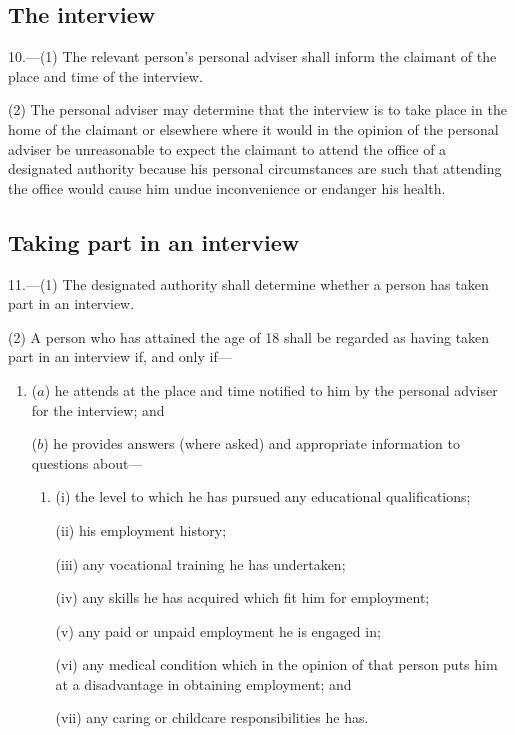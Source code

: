 \documentclass[12pt,a4paper]{article}
\begin{document}
\subsection[10. The interview]{The interview}

10.---(1)  The relevant person’s personal adviser shall inform the claimant of the place and time of the interview.

(2) The personal adviser may determine that the interview is to take place in the home of the claimant or elsewhere where it would in the opinion of the personal adviser be unreasonable to expect the claimant to attend the office of a designated authority because his personal circumstances are such that attending the office would cause him undue inconvenience or endanger his health.

\subsection[11. Taking part in an interview]{Taking part in an interview}

11.---(1)  The designated authority shall determine whether a person has taken part in an interview.

(2) A person who has attained the age of 18 shall be regarded as having taken part in an interview if, and only if—
\begin{enumerate}\item[]
($a$) he attends at the place and time notified to him by the personal adviser for the interview; and

($b$) he provides answers (where asked) and appropriate information to questions about—
\begin{enumerate}\item[]
(i) the level to which he has pursued any educational qualifications;

(ii) his employment history;

(iii) any vocational training he has undertaken;

(iv) any skills he has acquired which fit him for employment;

(v) any paid or unpaid employment he is engaged in;

(vi) any medical condition which in the opinion of that person puts him at a disadvantage in obtaining employment; and

(vii) any caring or childcare responsibilities he has.
\end{enumerate}
\end{enumerate}
\end{document}
